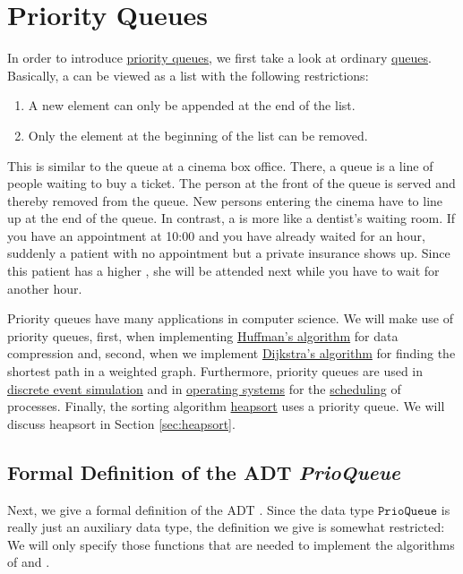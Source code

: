 \chapter{Priority Queues \label{chap:prioqueue}}
In order to introduce \href{https://en.wikipedia.org/wiki/Priority_queue}{priority queues},
we first take a look at ordinary
\href{https://en.wikipedia.org/wiki/Queue_(abstract_data_type)}{queues}.
Basically, a  can be viewed as a list with the following restrictions:
\begin{enumerate}
\item A new element can only be appended at the end of the list.
\item Only the element at the beginning of the list can be removed.
\end{enumerate}
This is similar to the queue at a cinema box office.  There, a queue is a line of people
waiting to buy a ticket.  The person at the front of the queue is served and thereby removed from
the queue.  New persons entering the cinema have to line up at the end of the queue.  In contrast, a
 is more like a dentist's waiting room.  If you have an appointment at 10:00 and you
have already waited for an hour, suddenly a patient with no appointment but a private insurance
shows up.  Since this patient has a higher , she will be attended next while you have
to wait for another hour. 

Priority queues have many applications in computer science.  We will make use of priority queues,
first, when implementing \href{https://en.wikipedia.org/wiki/Huffman_coding}{Huffman's algorithm}
for data compression and, second, when we implement
\href{https://en.wikipedia.org/wiki/Dijkstra%27s_algorithm}{Dijkstra's algorithm} 
for finding the shortest path in a weighted graph.  Furthermore, priority 
queues are used in \href{https://en.wikipedia.org/wiki/Discrete_event_simulation}{discrete event simulation}
and in \href{https://en.wikipedia.org/wiki/Operating_system}{operating systems} for the
\href{https://en.wikipedia.org/wiki/Scheduling_(computing)}{scheduling} of 
processes. Finally, the sorting algorithm \href{https://en.wikipedia.org/wiki/Heapsort}{heapsort} uses a
priority queue. We will discuss heapsort in Section \ref{sec:heapsort}.

\section[Formal Definition]{Formal Definition of the ADT \textsl{PrioQueue}}
Next, we give a formal definition of the ADT .  Since the data type
$\texttt{PrioQueue}$ is really just an auxiliary data type, the definition we give is somewhat
restricted: We will only specify those functions that are needed to implement the algorithms 
of  and .

